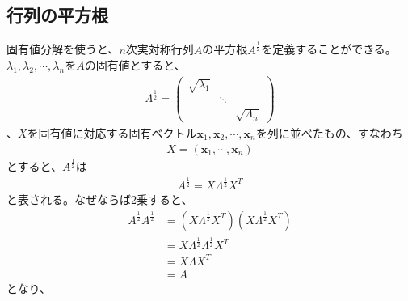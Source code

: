 \subsection{行列の平方根}
固有値分解を使うと、$n$次実対称行列$A$の平方根$\displaystyle{A^{\frac{1}{2}}}$を定義することができる。$\lambda_1, \lambda_2, \cdots, \lambda_n$を$A$の固有値とすると、
\begin{align*}
  \Lambda^{\frac{1}{2}} = \left(
                            \begin{array}{ccc}
                              \sqrt{\lambda_1} &        & \\
                                               & \ddots & \\
                                               &        & \sqrt{\Lambda_n}
                            \end{array}
                          \right)
\end{align*}
、$X$を固有値に対応する固有ベクトル$\mathbf{x}_1, \mathbf{x}_2, \cdots, \mathbf{x}_n$を列に並べたもの、すなわち
\begin{align*}
  X = \left(\mathbf{x}_1, \cdots, \mathbf{x}_n\right)
\end{align*}
とすると、$A^\frac{1}{2}$は
\begin{align*}
  A^\frac{1}{2} = X \Lambda^{\frac{1}{2}} X^T
\end{align*}
と表される。なぜならば2乗すると、
\begin{align*}
  A^{\frac{1}{2}} A^{\frac{1}{2}} & = \left(X \Lambda^{\frac{1}{2}} X^T\right) \left(X \Lambda^{\frac{1}{2}} X^T\right) \\
                                  & = X \Lambda^{\frac{1}{2}} \Lambda^{\frac{1}{2}} X^T \\
                                  & = X \Lambda X^T \\
                                  & = A
\end{align*}
となり、
